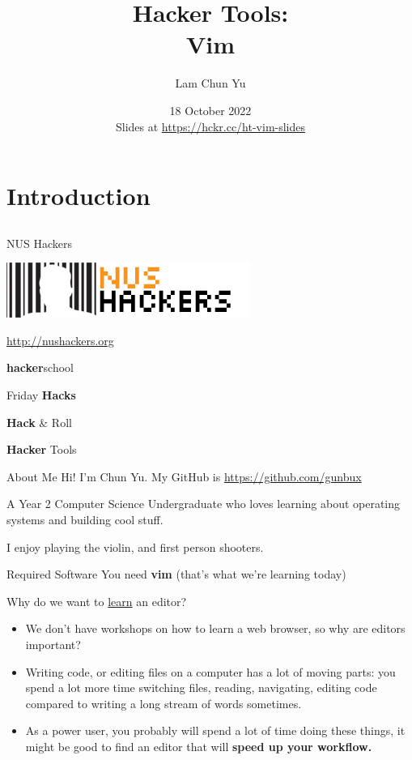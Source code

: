 \documentclass[12pt]{beamer}
\title{Hacker Tools: \\Vim}
\author{Lam Chun Yu}
\date{18 October 2022 \\ Slides at \url{https://hckr.cc/ht-vim-slides}}
\begin{document}
\frame[plain]{\titlepage}

\section{Introduction}
\subsection{}

\begin{frame}{NUS Hackers}

  \begin{center}
    \includegraphics[width=0.5\linewidth]{../NUSHackers}

    \url{http://nushackers.org}
  \end{center}

  \begin{center}
    \textbf{hacker}school

    Friday \textbf{Hacks}

    \textbf{Hack} \& Roll

    \textbf{Hacker} Tools
  \end{center}

\end{frame}

\begin{frame}{About Me}
  Hi! I'm Chun Yu. My GitHub is \url{https://github.com/gunbux}

  A Year 2 Computer Science Undergraduate who loves learning about operating systems and building cool stuff.

  I enjoy playing the violin, and first person shooters.

\end{frame}

\begin{frame}{Required Software}
  You need \textbf{vim} (that's what we're learning today)
\end{frame}

\begin{frame}{Why do we want to \underline{learn} an editor?}
  \begin{itemize}
    \item We don't have workshops on how to learn a web browser, so why are editors important?
    \item Writing code, or editing files on a computer has a lot of moving parts: you spend a lot more time switching files, reading, navigating, editing code compared to writing a long stream of words sometimes.
    \item As a power user, you probably will spend a lot of time doing these things, it might be good to find an editor that will \textbf{speed up your workflow.}
  \end{itemize}
\end{frame}
\end{document}
